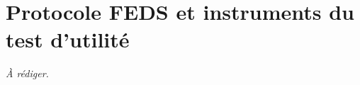 \chapter{Protocole FEDS et instruments du test d'utilit\'e}\label{annexe:panel-experts}


\textit{\`A r\'ediger.}
